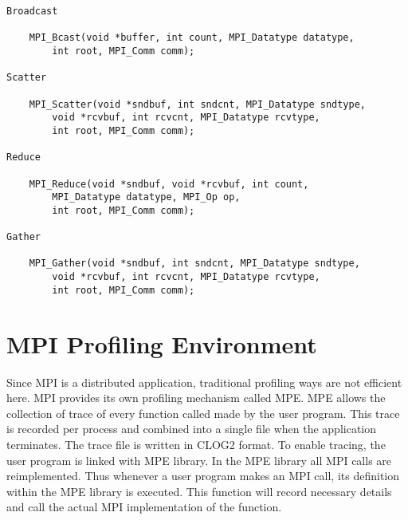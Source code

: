 \begin{verbatim}
Broadcast

    MPI_Bcast(void *buffer, int count, MPI_Datatype datatype,
	    int root, MPI_Comm comm);

Scatter

    MPI_Scatter(void *sndbuf, int sndcnt, MPI_Datatype sndtype,
	    void *rcvbuf, int rcvcnt, MPI_Datatype rcvtype,
	    int root, MPI_Comm comm);

Reduce

    MPI_Reduce(void *sndbuf, void *rcvbuf, int count,
	    MPI_Datatype datatype, MPI_Op op,
	    int root, MPI_Comm comm);

Gather

    MPI_Gather(void *sndbuf, int sndcnt, MPI_Datatype sndtype,
	    void *rcvbuf, int rcvcnt, MPI_Datatype rcvtype,
	    int root, MPI_Comm comm);

\end{verbatim}    
\section{MPI Profiling Environment}
    Since MPI is a distributed application, traditional profiling ways are not efficient here. MPI provides its own profiling mechanism called MPE. MPE allows the collection of trace of every function called made by the user program. This trace is recorded per process and combined into a single file when the application terminates. The trace file is written in CLOG2 format. To enable tracing, the user program is linked with MPE library. In the MPE library all MPI calls are reimplemented. Thus whenever a user program makes an MPI call, its definition within the MPE library is executed. This function will record necessary details and call the actual MPI implementation of the function. 
